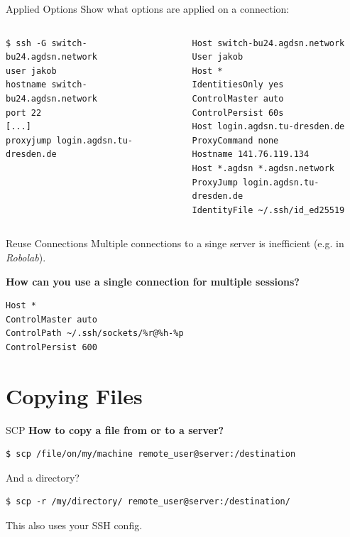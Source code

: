 \documentclass[10pt, graphics, aspectratio=169, table]{beamer}
\begin{document}
\begin{frame}[fragile]{Applied Options}
	Show what options are applied on a connection:
	\begin{columns}
		\begin{lstlisting}
$ ssh -G switch-bu24.agdsn.network
user jakob
hostname switch-bu24.agdsn.network
port 22
[...]
proxyjump login.agdsn.tu-dresden.de
		\end{lstlisting}
		\begin{lstlisting}
Host switch-bu24.agdsn.network
User jakob
Host *
IdentitiesOnly yes
ControlMaster auto
ControlPersist 60s
Host login.agdsn.tu-dresden.de
ProxyCommand none
Hostname 141.76.119.134
Host *.agdsn *.agdsn.network
ProxyJump login.agdsn.tu-dresden.de
IdentityFile ~/.ssh/id_ed25519
		\end{lstlisting}
    \end{columns}
\end{frame}

\begin{frame}[fragile]{Reuse Connections}
	Multiple connections to a singe server is inefficient (e.g. in \emph{Robolab}).
	\pause

	\textbf{How can you use a single connection for multiple sessions?}
	\begin{lstlisting}
Host *
ControlMaster auto
ControlPath ~/.ssh/sockets/%r@%h-%p
ControlPersist 600
	\end{lstlisting}
\end{frame}

\section{Copying Files}
\begin{frame}[fragile]{SCP}
	\textbf{How to copy a file from or to a server?}
	\pause

	\begin{lstlisting}
$ scp /file/on/my/machine remote_user@server:/destination
	\end{lstlisting}
	\pause

	And a directory?
	\begin{lstlisting}
$ scp -r /my/directory/ remote_user@server:/destination/
	\end{lstlisting}
	This also uses your SSH config.
\end{frame}
\end{document}
